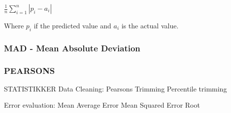  $ \frac{1}{n}\sum_{i=1}^{n}|p_i-a_i| $

 Where $p_i$ if the predicted value and $a_i$ is the actual value.

\subsubsection{MAD - Mean Absolute Deviation}


\subsubsection{PEARSONS} \label{sec:Pearsons}


STATISTIKKER
	Data Cleaning:
		Pearsons
		Trimming
		Percentile trimming

	Error evaluation:
		Mean Average Error
		Mean Squared Error
		Root 
